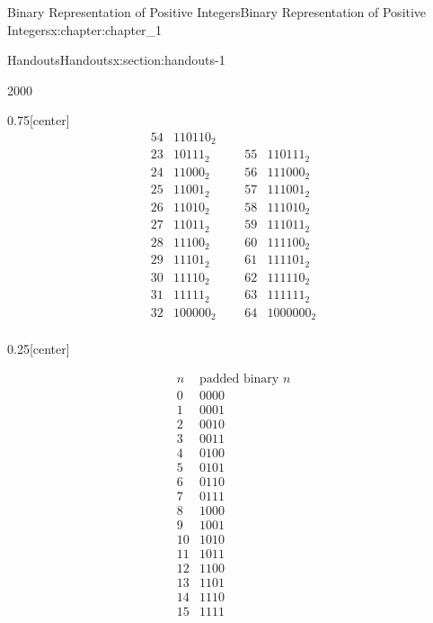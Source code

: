 \documentclass[oneside,10pt,]{book}
\numberwithin{equation}{section}
\begin{document}
\begin{chapterptx}{Binary Representation of Positive Integers}{}{Binary Representation of Positive Integers}{}{}{x:chapter:chapter_1}
\begin{sectionptx}{Handouts}{}{Handouts}{}{}{x:section:handouts-1}
\begin{sidebyside}{2}{0}{0}{0}
\begin{sbspanel}{0.75}[center]
\begin{equation*}
\begin{array}{ccccc}
54 & 110110_2 \\
23 & 10111_2 & \text{     } &
55 & 110111_2 \\
24 & 11000_2 & \text{     } &
56 & 111000_2 \\
25 & 11001_2 & \text{     } &
57 & 111001_2 \\
26 & 11010_2 & \text{     } &
58 & 111010_2 \\
27 & 11011_2 & \text{     } &
59 & 111011_2 \\
28 & 11100_2 & \text{     } &
60 & 111100_2 \\
29 & 11101_2 & \text{     } &
61 & 111101_2 \\
30 & 11110_2 & \text{     } &
62 & 111110_2 \\
31 & 11111_2 & \text{     } &
63 & 111111_2 \\
32 & 100000_2 & \text{     }
& 64 & 1000000_2 \\
\end{array}
\end{equation*}
%
\end{sbspanel}%
\begin{sbspanel}{0.25}[center]%
\par
%
\begin{equation*}
\begin{array}{cc}
n & \text{padded
binary } n \\
0 & 0000 \\
1 & 0001 \\
2 & 0010 \\
3 & 0011 \\
4 & 0100 \\
5 & 0101 \\
6 & 0110 \\
7 & 0111 \\
8 & 1000 \\
9 & 1001 \\
10 & 1010 \\
11 & 1011 \\
12 & 1100 \\
13 & 1101 \\
14 & 1110 \\
15 & 1111 \\
\end{array}
\end{equation*}
%
\end{sbspanel}%
\end{sidebyside}%
\end{sectionptx}
\end{chapterptx}
%
%
\typeout{************************************************}
\end{document}
